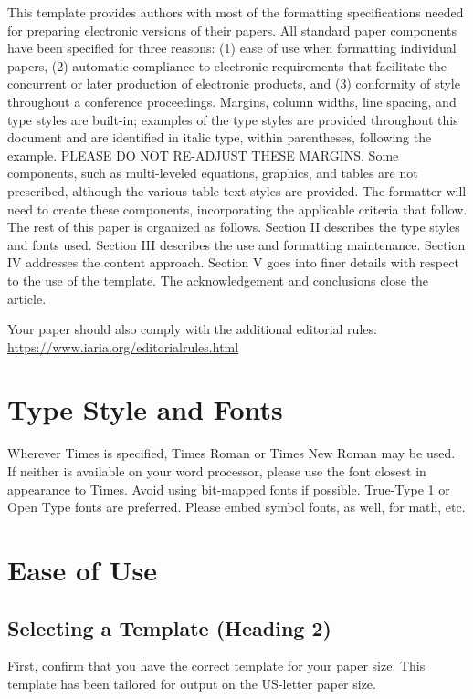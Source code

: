 \documentclass[conference,flushend]{iaria-lite}
\begin{document}
This template provides authors with most of the formatting specifications needed for preparing electronic versions of their papers. All standard paper components have been specified for three reasons: (1) ease of use when formatting individual papers, (2) automatic compliance to electronic requirements that facilitate the concurrent or later production of electronic products, and (3) conformity of style throughout a conference proceedings. Margins, column widths, line spacing, and type styles are built-in; examples of the type styles are provided throughout this document and are identified in italic type, within parentheses, following the example. PLEASE DO NOT RE-ADJUST THESE MARGINS. Some components, such as multi-leveled equations, graphics, and tables are not prescribed, although the various table text styles are provided. The formatter will need to create these components, incorporating the applicable criteria that follow. The rest of this paper is organized as follows. Section II describes the type styles and fonts used. Section III describes the use and formatting maintenance. Section IV addresses the content approach. Section V goes into finer details with respect to the use of the template.  The acknowledgement and conclusions close the article.

Your paper should also comply with the additional  editorial rules:
\url{https://www.iaria.org/editorialrules.html} \faWarning{}

\section{Type Style and Fonts}
Wherever Times is specified, Times Roman or Times New Roman may be used. If neither is available on your word processor, please use the font closest in appearance to Times. Avoid using bit-mapped fonts if possible. True-Type 1 or Open Type fonts are preferred. Please embed symbol fonts, as well, for math, etc.

\section{Ease of Use}

\subsection{Selecting a Template (Heading 2)}
First, confirm that you have the correct template for your paper size. This template has been tailored for output on the US-letter paper size.
\end{document}
